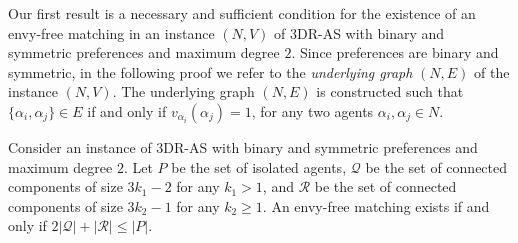 
Our first result is a necessary and sufficient condition for the existence of an envy-free matching in an instance $(N, V)$ of 3DR-AS with binary and symmetric preferences and maximum degree $2$. Since preferences are binary and symmetric, in the following proof we refer to the \emph{underlying graph} $(N, E)$ of the instance $(N, V)$. The underlying graph $(N, E)$ is constructed such that $\{ \alpha_i, \alpha_j \} \in E$ if and only if $v_{\alpha_i}(\alpha_j) = 1$, for any two agents $\alpha_i, \alpha_j \in N$.

\begin{lem}
\label{lem:threed_efr_as_ef_if_and_only_if}
Consider an instance of 3DR-AS with binary and symmetric preferences and maximum degree $2$. Let $P$ be the set of isolated agents, $\mathcal{Q}$ be the set of connected components of size $3{k_1} - 2$ for any ${k_1} > 1$, and $\mathcal{R}$ be the set of connected components of size $3{k_2} - 1$ for any ${k_2} \geq 1$. An envy-free matching exists if and only if $2|\mathcal{Q}| + |\mathcal{R}| \leq |P|$.
\end{lem}
